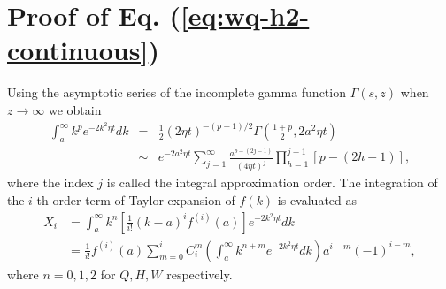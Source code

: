 \documentclass[english,aps,superscriptaddress,preprint]{revtex4-1}
\begin{document}



\onecolumngrid

\appendix

\section{Proof of Eq. (\ref{eq:wq-h2-continuous})}

\label{sec:proof}Using the asymptotic series of the incomplete gamma
function $\Gamma(s,z)$ when $z\rightarrow\infty$ we obtain 
\begin{eqnarray}
\int_{a}^{\infty}k^{p}e^{-2k^{2}\eta t}dk & = & \frac{1}{2}(2\eta t)^{-(p+1)/2}\Gamma\left(\frac{1+p}{2},2a^{2}\eta t\right)\nonumber \\
 & \sim & e^{-2a^{2}\eta t}\sum_{j=1}^{\infty}\frac{a^{p-(2j-1)}}{(4\eta t)^{j}}\prod_{h=1}^{j-1}\left[p-\left(2h-1\right)\right],\label{eq:expansion}
\end{eqnarray}
where the index $j$ is called the integral approximation order. The
integration of the $i$-th order term of Taylor expansion of $f(k)$
is evaluated as 
\begin{align}
X_{i} & =\int_{a}^{\infty}k^{n}\left[\frac{1}{i!}(k-a)^{i}f^{(i)}(a)\right]e^{-2k^{2}\eta t}dk\nonumber \\
 & =\frac{1}{i!}f^{(i)}(a)\sum_{m=0}^{i}C_{i}^{m}\left(\int_{a}^{\infty}k^{n+m}e^{-2k^{2}\eta t}dk\right)a^{i-m}(-1)^{i-m},
\end{align}
where $n=0,1,2$ for $Q,H,W$ respectively. 
\end{document}
